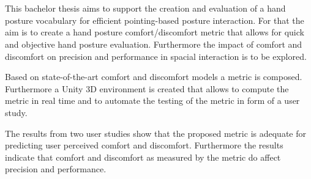 \chapter{\abstractname}

This bachelor thesis aims to support the creation and evaluation of a hand posture vocabulary for efficient pointing-based posture interaction. For that the aim is to create a hand posture comfort/discomfort metric that allows for quick and objective hand posture evaluation. Furthermore the impact of comfort and discomfort on precision and performance in spacial interaction is to be explored.

Based on state-of-the-art comfort and discomfort models a metric is composed. Furthermore a Unity 3D environment is created that allows to compute the metric in real time and to automate the testing of the metric in form of a user study. 

The results from two user studies show that the proposed metric is adequate for predicting user perceived comfort and discomfort. Furthermore the results indicate that comfort and discomfort as measured by the metric do affect precision and performance.